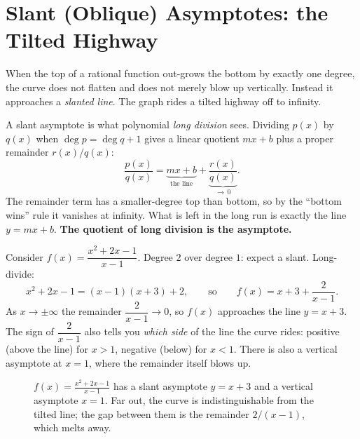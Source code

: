 \section{Slant (Oblique) Asymptotes: the Tilted Highway}
\label{ch09:slant}

When the top of a rational function out-grows the bottom by exactly one degree,
the curve does not flatten and does not merely blow up vertically. Instead it
approaches a \emph{slanted line}. The graph rides a tilted highway off to
infinity.

\begin{intuitionbox}
A slant asymptote is what polynomial \emph{long division} sees. Dividing
$p(x)$ by $q(x)$ when $\deg p = \deg q + 1$ gives a linear quotient $mx+b$ plus a
proper remainder $r(x)/q(x)$:
\[
   \frac{p(x)}{q(x)} = \underbrace{mx+b}_{\text{the line}}
   + \underbrace{\frac{r(x)}{q(x)}}_{\to\, 0}.
\]
The remainder term has a smaller-degree top than bottom, so by the ``bottom
wins'' rule it vanishes at infinity. What is left in the long run is exactly the
line $y=mx+b$. \textbf{The quotient of long division is the asymptote.}
\end{intuitionbox}

\begin{example}
\label{ch09:ex-slant}
Consider $f(x)=\dfrac{x^2+2x-1}{x-1}$. Degree $2$ over degree $1$: expect a
slant. Long-divide:
\[
   x^2+2x-1 = (x-1)(x+3) + 2,
   \qquad\text{so}\qquad
   f(x) = x+3 + \frac{2}{x-1}.
\]
As $x\to\pm\infty$ the remainder $\dfrac{2}{x-1}\to 0$, so $f(x)$ approaches the
line $y=x+3$. The sign of $\dfrac{2}{x-1}$ also tells you \emph{which side} of
the line the curve rides: positive (above the line) for $x>1$, negative (below)
for $x<1$. There is also a vertical asymptote at $x=1$, where the remainder
itself blows up.
\end{example}

\begin{figure}[H]
\centering
{}
\caption{$f(x)=\frac{x^2+2x-1}{x-1}$ has a slant asymptote $y=x+3$ and a vertical
asymptote $x=1$. Far out, the curve is indistinguishable from the tilted line;
the gap between them is the remainder $2/(x-1)$, which melts away.}
\label{ch09:fig-slant}
\end{figure}

